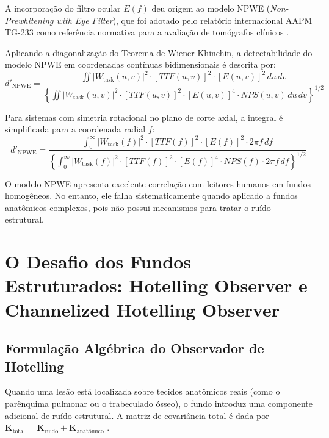 A incorporação do filtro ocular $E(f)$ deu origem ao modelo NPWE (\emph{Non-Prewhitening with Eye Filter}), que foi adotado pelo relatório internacional AAPM TG-233 como referência normativa para a avaliação de tomógrafos clínicos \cite{aapm_tg233_2019}.

Aplicando a diagonalização do Teorema de Wiener-Khinchin, a detectabilidade do modelo NPWE em coordenadas contínuas bidimensionais é descrita por:
\begin{equation}
  d'_{\text{NPWE}} = \frac{\iint \left| W_{\text{task}}(u, v) \right|^2 \cdot \left[ TTF(u, v) \right]^2 \cdot \left[ E(u, v) \right]^2 \, du \, dv}{\left\{ \iint \left| W_{\text{task}}(u, v) \right|^2 \cdot \left[ TTF(u, v) \right]^2 \cdot \left[ E(u, v) \right]^4 \cdot NPS(u, v) \, du \, dv \right\}^{1/2}}
  \label{eq:dprime_npwe_2d}
\end{equation}

Para sistemas com simetria rotacional no plano de corte axial, a integral é simplificada para a coordenada radial $f$:
\begin{equation}
  d'_{\text{NPWE}} = \frac{\int_{0}^{\infty} \left| W_{\text{task}}(f) \right|^2 \cdot \left[ TTF(f) \right]^2 \cdot \left[ E(f) \right]^2 \cdot 2\pi f \, df}{\left\{ \int_{0}^{\infty} \left| W_{\text{task}}(f) \right|^2 \cdot \left[ TTF(f) \right]^2 \cdot \left[ E(f) \right]^4 \cdot NPS(f) \cdot 2\pi f \, df \right\}^{1/2}}
  \label{eq:dprime_npwe_radial}
\end{equation}

O modelo NPWE apresenta excelente correlação com leitores humanos em fundos homogêneos. No entanto, ele falha sistematicamente quando aplicado a fundos anatômicos complexos, pois não possui mecanismos para tratar o ruído estrutural.

\section{O Desafio dos Fundos Estruturados: Hotelling Observer e Channelized Hotelling Observer}
\label{sec:cho}

\subsection{Formulação Algébrica do Observador de Hotelling}
Quando uma lesão está localizada sobre tecidos anatômicos reais (como o parênquima pulmonar ou o trabeculado ósseo), o fundo introduz uma componente adicional de ruído estrutural. A matriz de covariância total é dada por $\mathbf{K}_{\text{total}} = \mathbf{K}_{\text{ruído}} + \mathbf{K}_{\text{anatômico}}$ \cite{barrett_myers_2004}.

